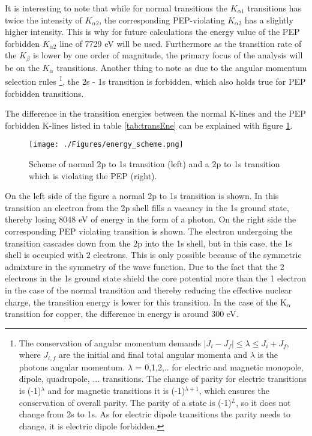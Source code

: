 It is interesting to note that while for normal transitions the $K_{\alpha 1}$ transitions has twice the intensity of $K_{\alpha 2}$, the corresponding PEP-violating $K_{\alpha 2}$ has a slightly higher intensity. This is why for future calculations the energy value of the PEP forbidden $K_{\alpha 2}$ line of 7729 eV will be used. Furthermore as the transition rate of the $K_{\beta}$ is lower by one order of magnitude, the primary focus of the analysis will be on the $K_{\alpha}$ transitions. Another thing to note as due to the angular momentum selection rules \footnote{The conservation of angular momentum demands $|J_{i}-J_{f}| \leq \lambda \leq J_{i}+J_{f}$, where $J_{i,f}$ are the initial and final total angular momenta and $\lambda$ is the photons angular momentum. $\lambda$ = 0,1,2,.. for electric and magnetic monopole, dipole, quadrupole, ... transitions. The change of parity for electric transitions is (-1)$^{\lambda}$ and for magnetic transitions it is (-1)$^{\lambda+1}$, which ensures the conservation of overall parity. The parity of a state is (-1)$^{L}$, so it does not change from 2s to 1s. As for electric dipole transitions the parity needs to change, it is electric dipole forbidden.}, the 2s - 1s transition is forbidden, which also holds true for PEP forbidden transitions.

The difference in the transition energies between the normal K-lines and the PEP forbidden K-lines listed in table \ref{tab:transEne} can be explained with figure \ref{fig:forbTrans}.
\begin{figure}[h]
 \centering
 \texttt{[image: ./Figures/energy\_scheme.png]}
 \caption{Scheme of normal 2p to 1s transition (left) and a 2p to 1s transition which is violating the PEP (right).}
 \label{fig:forbTrans}
\end{figure}
On the left side of the figure a normal 2p to 1s transition is shown. In this transition an electron from the 2p shell fills a vacancy in the 1s ground state, thereby losing 8048 eV of energy in the form of a photon. On the right side the corresponding PEP violating transition is shown. The electron undergoing the transition cascades down from the 2p into the 1s shell, but in this case, the 1s shell is occupied with 2 electrons. This is only possible because of the symmetric admixture in the symmetry of the wave function. Due to the fact that the 2 electrons in the 1s ground state shield the core potential more than the 1 electron in the case of the normal transition and thereby reducing the effective nuclear charge, the transition energy is lower for this transition. In the case of the K$_{\alpha}$ transition for copper, the difference in energy is around 300 eV.
